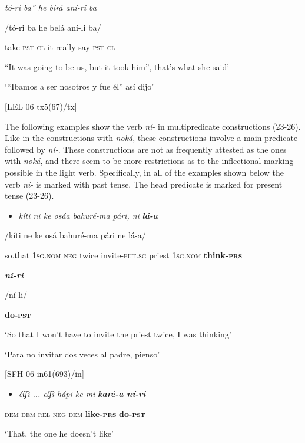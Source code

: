 \textit{tó-ri     ba”   he   birá   aní-ri     ba}

/tó-ri    ba  he  belá  aní-li    ba/

take-\textsc{pst   cl} it   really   say-\textsc{pst   cl}

  “It was going to be us, but it took him”, that’s what she said’

  ‘“Ibamos a ser nosotros y fue él” así dijo’

  [LEL 06 tx5(67)/tx]

  The following examples show the verb \textit{ní-} in multipredicate constructions (23-26). Like in the constructions with \textit{noká}, these constructions involve a main predicate followed by \textit{ní-}. These constructions are not as frequently attested as the ones with \textit{noká}, and there seem to be more restrictions as to the inflectional marking possible in the light verb. Specifically, in all of the examples shown below the verb \textit{ní-} is marked with past tense. The head predicate is marked for present tense (23-26).

\begin{itemize}
\item \textit{kíti   ni   ke   osáa     bahuré-ma   pári,   ni} \textbf{\textit{lá-a}}   
\end{itemize}

/kíti  ne  ke  osá    bahuré-ma  pári  ne    lá-a/

so.that  1\textsc{sg.nom}  \textsc{neg}  twice    invite-\textsc{fut.sg}  priest  1\textsc{sg.nom}  \textbf{think-\textsc{prs}}

\textbf{\textit{ní-ri}}

/ní-li/

\textbf{do\textsc{{}-pst}}

  ‘So that I won’t have to invite the priest twice, I was thinking’

‘Para no invitar dos veces al padre, pienso’

  [SFH 06 in61(693)/in]

\begin{itemize}
\item \textit{ét͡ʃi ...  et͡ʃi   hápi   ke   mi} \textbf{\textit{karé-a     ní-ri}}
\end{itemize}

  \textsc{dem   dem   rel}\MakeUppercase{} \textsc{neg   dem} \textbf{like-\textsc{prs} }\textbf{do\textsc{{}-pst}}\MakeUppercase{} 

  ‘That, the one he doesn’t like’

